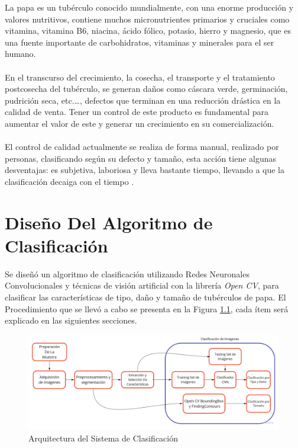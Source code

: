 La papa es un tubérculo conocido mundialmente, con una enorme producción y valores nutritivos, contiene muchos micronutrientes primarios y cruciales como vitamina, vitamina B6, niacina, ácido fólico, potasio, hierro y magnesio, que es una fuente importante de carbohidratos, vitaminas y minerales para el ser humano.\\
\\
En el transcurso del crecimiento, la cosecha, el transporte y el tratamiento postcosecha del tubérculo, se generan daños como cáscara verde, germinación, pudrición seca, etc.…, defectos que terminan en una reducción drástica en la calidad de venta. Tener un control de este producto es fundamental para aumentar el valor de este y generar un crecimiento en su comercialización.\\
\\
El control de calidad actualmente se realiza de forma manual, realizado por personas, clasificando según su defecto y tamaño, esta acción tiene algunas desventajas: es subjetiva, laboriosa y lleva bastante tiempo, llevando a que la clasificación decaiga con el tiempo \cite{refjaither}.



\chapter{Diseño Del Algoritmo de Clasificación}


Se diseñó un algoritmo de clasificación utilizando Redes Neuronales Convolucionales y técnicas de visión artificial con la librería \textit{Open CV}, para clasificar las características de tipo, daño y tamaño de tubérculos de papa. El Procedimiento que se llevó a cabo se presenta en la Figura \ref{fig:flujogeneral}, cada ítem será explicado en las siguientes secciones. 


\begin{figure}[ht]
	\centering
	\includegraphics[scale=0.3]{Figs/FGGeneral.jpg}
	\caption{Arquitectura del Sistema de Clasificación}
	\label{fig:flujogeneral}
\end{figure}


